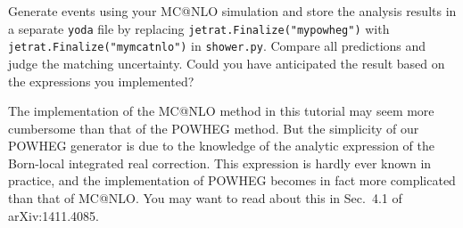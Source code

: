 \documentclass[10pt,fleqn]{scrartcl}
\begin{document}
Generate events using your MC@NLO simulation and store the analysis results
in a separate {\tt yoda} file by replacing \verb!jetrat.Finalize("mypowheg")!
with \verb!jetrat.Finalize("mymcatnlo")! in {\tt shower.py}. Compare all 
predictions and judge the matching uncertainty. Could you have anticipated 
the result based on the expressions you implemented?

The implementation of the MC@NLO method in this tutorial may seem more cumbersome 
than that of the POWHEG method. But the simplicity of our POWHEG generator is due 
to the knowledge of the analytic expression of the Born-local integrated 
real correction. This expression is hardly ever known in practice, and the 
implementation of POWHEG becomes in fact more complicated than that of MC@NLO.
You may want to read about this in Sec.~4.1 of arXiv:1411.4085.
\end{document}
